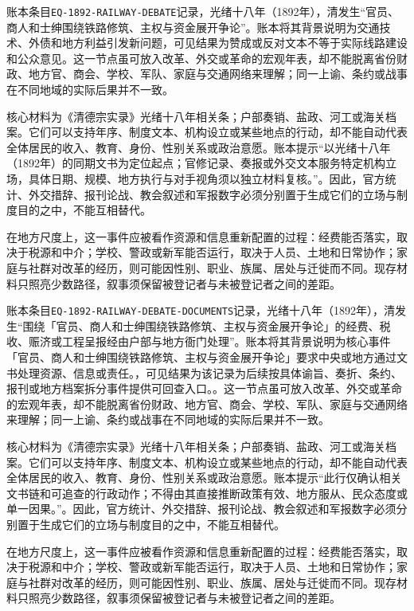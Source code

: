 账本条目\texttt{EQ-1892-RAILWAY-DEBATE}记录，光绪十八年（1892年），清发生“官员、商人和士绅围绕铁路修筑、主权与资金展开争论”。账本将其背景说明为交通技术、外债和地方利益引发新问题，可见结果为赞成或反对文本不等于实际线路建设和公众意见。这一节点虽可放入改革、外交或革命的宏观年表，却不能脱离省份财政、地方官、商会、学校、军队、家庭与交通网络来理解；同一上谕、条约或战事在不同地域的实际后果并不一致。

核心材料为《清德宗实录》光绪十八年相关条；户部奏销、盐政、河工或海关档案。它们可以支持年序、制度文本、机构设立或某些地点的行动，却不能自动代表全体居民的收入、教育、身份、性别关系或政治意愿。账本提示“以光绪十八年（1892年）的同期文书为定位起点；官修记录、奏报或外交文本服务特定机构立场，具体日期、规模、地方执行与对手视角须以独立材料复核。”。因此，官方统计、外交措辞、报刊论战、教会叙述和军报数字必须分别置于生成它们的立场与制度目的之中，不能互相替代。

在地方尺度上，这一事件应被看作资源和信息重新配置的过程：经费能否落实，取决于税源和中介；学校、警政或新军能否运行，取决于人员、土地和日常协作；家庭与社群对改革的经历，则可能因性别、职业、族属、居处与迁徙而不同。现存材料只照亮少数路径，叙事须保留被登记者与未被登记者之间的差距。

账本条目\texttt{EQ-1892-RAILWAY-DEBATE-DOCUMENTS}记录，光绪十八年（1892年），清发生“围绕「官员、商人和士绅围绕铁路修筑、主权与资金展开争论」的经费、税收、赈济或工程呈报经由户部与地方衙门处理”。账本将其背景说明为核心事件「官员、商人和士绅围绕铁路修筑、主权与资金展开争论」要求中央或地方通过文书处理资源、信息或责任。，可见结果为该记录为后续按具体谕旨、奏折、条约、报刊或地方档案拆分事件提供可回查入口。。这一节点虽可放入改革、外交或革命的宏观年表，却不能脱离省份财政、地方官、商会、学校、军队、家庭与交通网络来理解；同一上谕、条约或战事在不同地域的实际后果并不一致。

核心材料为《清德宗实录》光绪十八年相关条；户部奏销、盐政、河工或海关档案。它们可以支持年序、制度文本、机构设立或某些地点的行动，却不能自动代表全体居民的收入、教育、身份、性别关系或政治意愿。账本提示“此行仅确认相关文书链和可追查的行政动作；不得由其直接推断政策有效、地方服从、民众态度或单一因果。”。因此，官方统计、外交措辞、报刊论战、教会叙述和军报数字必须分别置于生成它们的立场与制度目的之中，不能互相替代。

在地方尺度上，这一事件应被看作资源和信息重新配置的过程：经费能否落实，取决于税源和中介；学校、警政或新军能否运行，取决于人员、土地和日常协作；家庭与社群对改革的经历，则可能因性别、职业、族属、居处与迁徙而不同。现存材料只照亮少数路径，叙事须保留被登记者与未被登记者之间的差距。

